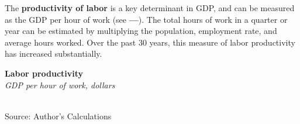 \documentclass{report}
\makeatletter
\newcommand{\tbllink}[1]{\href{https://raw.githubusercontent.com/bdecon/US-chartbook/master/chartbook/data/#1}{\faTable}}
\newcommand*\short[1]{\expandafter\@gobbletwo\number\numexpr#1\relax}
\newcommand{\shdateaxisticks}{
		date coordinates in=x, axis line style={draw=none},
		xmax={2023-02-15},
		max space between ticks=40,	    
		xtick={{1990-01-01}, {1995-01-01}, {2000-01-01}, 
			{2005-01-01}, {2010-01-01}, {2015-01-01}, {2020-01-01}},
		minor xtick={},
		enlarge y limits={0.06}, enlarge x limits={0.01},
		}
\newcommand{\thickline}[4]{\addplot[ultra thick, no markers, color=#1] 
		table [x=#2, y=#3, col sep=comma] {#4};	}
\newcommand{\rbars}{
		\fill[color=black!10] (axis cs:{1990-07-01},\pgfkeysvalueof{/pgfplots/ymin}) rectangle 
			(axis cs:{1991-03-01}, \pgfkeysvalueof{/pgfplots/ymax});
		\fill[color=black!10] (axis cs:{2007-12-01},\pgfkeysvalueof{/pgfplots/ymin}) rectangle 
			(axis cs:{2009-07-01}, \pgfkeysvalueof{/pgfplots/ymax});
		\fill[color=black!10] (axis cs:{2001-03-01},\pgfkeysvalueof{/pgfplots/ymin}) rectangle 
			(axis cs:{2001-11-01}, \pgfkeysvalueof{/pgfplots/ymax});
		\fill[color=black!10] (axis cs:{2020-02-01},\pgfkeysvalueof{/pgfplots/ymin}) rectangle 
			(axis cs:{2020-05-01}, \pgfkeysvalueof{/pgfplots/ymax});}
\makeatother
\begin{document}
\vspace{3mm}

\begin{minipage}{0.76\textwidth}
\small The \textbf{productivity of labor} is a key determinant in GDP, and can be measured as the GDP per hour of work (see {\color{cyan!60!white}\textbf{---}}). The total hours of work in a quarter or year can be estimated by multiplying the population, employment rate, and average hours worked. Over the past 30 years, this measure of labor productivity has increased substantially. 
\end{minipage}

\begin{minipage}{0.3\textwidth}
\small 
\end{minipage}\hspace{8mm}
\begin{minipage}{0.405\textwidth}
\normalsize \textbf{Labor productivity}\\
\footnotesize{\textit{GDP per hour of work, dollars}}\\
\hspace*{-2mm} \\
\footnotesize{Source: Author's Calculations} \hfill \tbllink{gdpjobslvl.csv} 
\end{minipage}
\newpage
\hypertarget{oegr}{}
\end{document}
